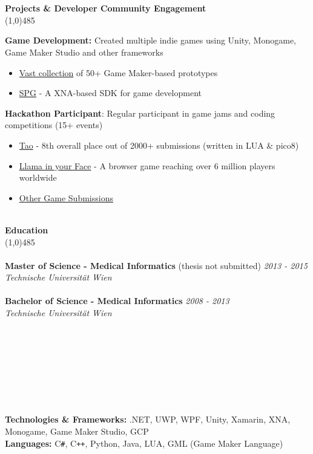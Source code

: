 \documentclass[9pt]{extarticle}
\newcommand\negativespace[1][-0.12cm]{\hspace*{#1}}
\begin{document}
\noindent %
\\
\\
\vspace*{-6pt}
{\negativespace \Large \bf Projects \& Developer Community Engagement}\\
\line(1,0){485}
\\
\noindent

\noindent
\textbf{Game Development:} Created multiple indie games using Unity, Monogame, Game Maker Studio and other frameworks
\begin{itemize}
\item \href{https://github.com/leorean/GMStudio}{Vast collection} of 50+ Game Maker-based prototypes
\item \href{https://github.com/leorean/SPG}{SPG} - A XNA-based SDK for game development
\end{itemize}
\textbf{Hackathon Participant}: Regular participant in game jams and coding competitions (15+ events)
\begin{itemize}
\item \href{https://ldjam.com/events/ludum-dare/55/tao}{Tao} - 8th overall place out of 2000+ submissions (written in LUA \& pico8)
\item \href{https://www.newgrounds.com/portal/view/599044}{Llama in your Face} - A browser game reaching over 6 million players worldwide
\item \href{https://ldjam.com/users/leorean/games}{Other Game Submissions}
\end{itemize}

\noindent %
\\
\vspace*{-6pt}
{\negativespace \Large \bf Education}\\
\line(1,0){485}\\
\\
\noindent
{\bf Master of Science - Medical Informatics} (thesis not submitted) \hfill \textit{2013 - 2015} \\
\textit{Technische Universität Wien} \\
\\
{\bf Bachelor of Science - Medical Informatics} \hfill \textit{2008 - 2013} \\
\textit{Technische Universität Wien} \\
\\
\\
\\
\\
\\
\\
\\
\\
\noindent
{\bf Technologies \& Frameworks:} .NET, UWP, WPF, Unity, Xamarin, XNA, Monogame, Game Maker Studio, GCP \\
{\bf Languages:} C\texttt{\#}, C\texttt{++}, Python, Java, LUA, GML (Game Maker Language)
\end{document}
